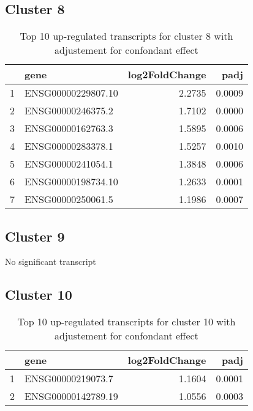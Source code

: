 \documentclass{article}
\begin{document}
\subsection{Cluster 8 }
\begin{table}[H]
\centering
\begin{tabular}{rlrr}
  \hline
 & gene & log2FoldChange & padj \\ 
  \hline
1 & ENSG00000229807.10 & 2.2735 & 0.0009 \\ 
  2 & ENSG00000246375.2 & 1.7102 & 0.0000 \\ 
  3 & ENSG00000162763.3 & 1.5895 & 0.0006 \\ 
  4 & ENSG00000283378.1 & 1.5257 & 0.0010 \\ 
  5 & ENSG00000241054.1 & 1.3848 & 0.0006 \\ 
  6 & ENSG00000198734.10 & 1.2633 & 0.0001 \\ 
  7 & ENSG00000250061.5 & 1.1986 & 0.0007 \\ 
   \hline
\end{tabular}
\caption{Top 10 up-regulated transcripts for cluster 8 with adjustement for confondant effect} 
\label{tab:q3_1_conf_8}
\end{table}
\subsection{Cluster 9 }
No significant transcript
\subsection{Cluster 10 }
\begin{table}[H]
\centering
\begin{tabular}{rlrr}
  \hline
 & gene & log2FoldChange & padj \\ 
  \hline
1 & ENSG00000219073.7 & 1.1604 & 0.0001 \\ 
  2 & ENSG00000142789.19 & 1.0556 & 0.0003 \\ 
   \hline
\end{tabular}
\caption{Top 10 up-regulated transcripts for cluster 10 with adjustement for confondant effect} 
\label{tab:q3_1_conf_10}
\end{table}
\end{document}
